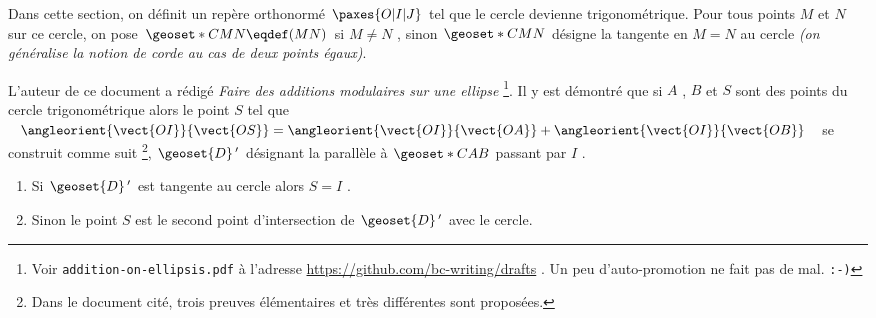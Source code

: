 Dans cette section, on définit un repère orthonormé $\paxes{O | I | J}$ tel que le cercle devienne trigonométrique.
Pour tous points $M$  et $N$ sur ce cercle, on pose $\geoset*{C}{MN} \eqdef (MN)$ si $M \neq N$ , sinon $\geoset*{C}{MN}$ désigne la tangente en $M = N$ au cercle \emph{(on généralise la notion de corde au cas de deux points égaux)}.


\medskip


L'auteur de ce document a rédigé \emph{\og Faire des additions modulaires sur une ellipse \fg}
\footnote{
	Voir \texttt{addition-on-ellipsis.pdf} à l'adresse \url{https://github.com/bc-writing/drafts} .
	Un peu d'auto-promotion ne fait pas de mal. \texttt{:-)}
}.
Il y est démontré que si $A$ , $B$ et $S$ sont des points du cercle trigonométrique alors le point $S$ tel que
$\angleorient{\vect{OI}}{\vect{OS}} = \angleorient{\vect{OI}}{\vect{OA}} + \angleorient{\vect{OI}}{\vect{OB}}$
se construit comme suit
\footnote{
	Dans le document cité, trois preuves élémentaires et très différentes sont proposées. 
},
$\geoset{D}\,'$ désignant la parallèle à $\geoset*{C}{AB}$ passant par $I$ .

\begin{enumerate}
	\item Si $\geoset{D}\,'$ est tangente au cercle alors $S = I$ .
	
	\item Sinon le point $S$ est le second point d'intersection de $\geoset{D}\,'$ avec le cercle.
\end{enumerate}


\vspace{1em}

\begin{center}
\end{center}

